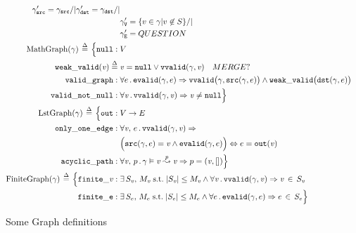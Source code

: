 \begin{figure}
\begin{gather*}
\begin{aligned}
       	 	\gamma'_{\mathtt{src}} = \gamma_{\mathtt{src}}/|
       	 	\gamma'_{\mathtt{dst}} = \gamma_{\mathtt{dst}}/| \null \\
       	 	&\gamma'_{\mathtt{V}} = \{v \in \gamma | v \not\in S\} /| \null \\ 
       	 	&\gamma'_{\mathtt{E}} = QUESTION \\
        \mathrm{MathGraph}(\gamma)\,\defeq\,\Big\{
          \mathtt{null}:\; & V\\
          \mathtt{weak\_valid}(\m{v}) \; \defeq \; & \m{v} = \mathtt{null} \vee
          \mathtt{vvalid}(\gamma, \m{v}) \quad MERGE? \\
          \mathtt{valid\_graph}:\;& \forall e\,.\,\mathtt{evalid}(\gamma, e) \Rightarrow
          \mathtt{vvalid}\big(\gamma, \mathtt{src}(\gamma, e)\big)\wedge
          \mathtt{weak\_valid}\big(\mathtt{dst}(\gamma, e)\big)\\
          \mathtt{valid\_not\_null}:\;& \forall \m{v}\,.\,\mathtt{vvalid}(\gamma, \m{v})
          \Rightarrow \m{v} \neq \mathtt{null} \Big\} \\
        \mathrm{LstGraph}(\gamma)\,\defeq\, \Big\{
          \mathtt{out}:\; & V \rightarrow E\\
          \mathtt{only\_one\_edge}:\; & \forall \m{v},\,e\,.\,
          \mathtt{vvalid}(\gamma, \m{v}) \Rightarrow \\
          & \Big(\mathtt{src}(\gamma, e) =\m{v} \wedge
          \mathtt{evalid}(\gamma, e)\Big) \Leftrightarrow
          e = \mathtt{out}(\m{v})\\
         \mathtt{acyclic\_path}:\; & \forall \m{v},\,p\,.\,
         \gamma \vDash \m{v} \overset{p}{\leadsto} \m{v} \Rightarrow p = (\m{v},[])\Big\} \\
       	\mathrm{FiniteGraph}(\gamma)\,\defeq\, \Big\{
          \mathtt{finite\_\m{v}}:\;&\exists\, S_\m{v},\, M_\m{v}\;\text{s.t.}\;\lvert S_\m{v}\rvert
          \leq M_\m{v} \wedge
          \forall \m{v}\,.\, \mathtt{vvalid}(\gamma,\m{v})\Rightarrow \m{v}\,\in\,S_\m{v}\\
          \mathtt{finite\_e}:\;&\exists\, S_e,\, M_e\;\text{s.t.}\;\lvert S_e\rvert
          \leq M_e \wedge
          \forall e\,.\, \mathtt{evalid}(\gamma,e)\Rightarrow e\,\in\,S_e \Big\}
    	\end{aligned}
    \end{gather*}
\caption{Some Graph definitions}
\label{fig:graphdefns}
\vspace{-1em}
\end{figure}